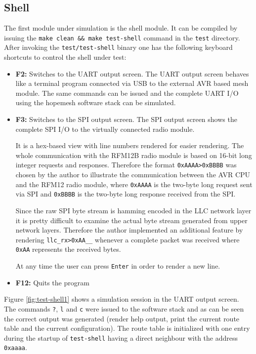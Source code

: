 \subsection{Shell}%
The first module under simulation is the shell module. It can be compiled by issuing the \texttt{make clean \&\& make test-shell} command in the \texttt{test} directory. After invoking the \texttt{test/test-shell} binary one has the following keyboard shortcuts to control the shell under test:

\begin{itemize}
    \item \textbf{F2:} Switches to the UART output screen. The UART output screen behaves like a terminal program connected via USB to the external AVR based mesh module. The same commands can be issued and the complete UART I/O using the hopemesh software stack can be simulated.
    \item \textbf{F3:} Switches to the SPI output screen. The SPI output screen shows the complete SPI I/O to the virtually connected radio module.

It is a hex-based view with line numbers rendered for easier rendering. The whole communication with the RFM12B radio module is based on 16-bit long integer requests and responses. Therefore the format \texttt{0xAAAA>0xBBBB} was chosen by the author to illustrate the communication between the AVR CPU and the RFM12 radio module, where \texttt{0xAAAA} is the two-byte long request sent via SPI and \texttt{0xBBBB} is the two-byte long response received from the SPI.

Since the raw SPI byte stream is hamming encoded in the LLC network layer it is pretty difficult to examine the actual byte stream generated from upper network layers. Therefore the author implemented an additional feature by rendering \texttt{llc\_rx>0xAA\_\_} whenever a complete packet was received where \texttt{0xAA} represents the received bytes.

At any time the user can press \texttt{Enter} in order to render a new line.
    \item \textbf{F12:} Quits the program
\end{itemize}

Figure \ref{fig:test-shell1} shows a simulation session in the UART output screen. The commands \texttt{?}, \texttt{l} and \texttt{c} were issued to the software stack and as can be seen the correct output was generated (render help output, print the current route table and the current configuration). The route table is initialized with one entry during the startup of \texttt{test-shell} having a direct neighbour with the address \texttt{0xaaaa}.

